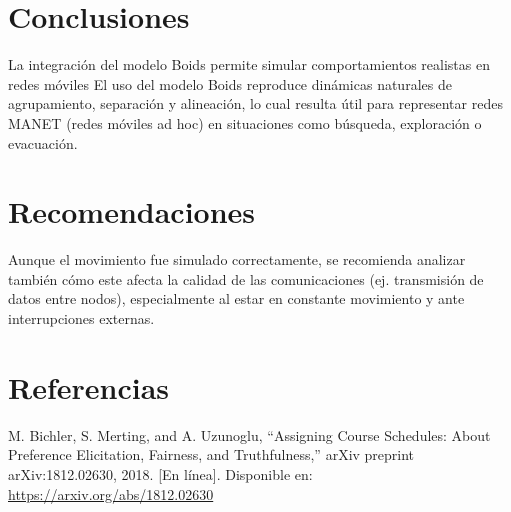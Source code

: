 \documentclass{article}
\begin{document}

\section{Conclusiones}\label{sec:concl}

La integración del modelo Boids permite simular comportamientos realistas en redes móviles
El uso del modelo Boids reproduce dinámicas naturales de agrupamiento, separación y alineación, lo cual resulta útil para representar redes MANET (redes móviles ad hoc) en situaciones como búsqueda, exploración o evacuación.

\section{Recomendaciones}\label{secrecomen}

Aunque el movimiento fue simulado correctamente, se recomienda analizar también cómo este afecta la calidad de las comunicaciones (ej. transmisión de datos entre nodos), especialmente al estar en constante movimiento y ante interrupciones externas.

\section{Referencias}
\renewcommand{\refname}{}
\begin{thebibliography}{9}

 \label{ref:BPS} M. Bichler, S. Merting, and A. Uzunoglu, 
“Assigning Course Schedules: About Preference Elicitation, Fairness, and Truthfulness,” 
arXiv preprint arXiv:1812.02630, 2018. [En línea]. Disponible en: 
\url{https://arxiv.org/abs/1812.02630}



\end{thebibliography}
\end{document}
